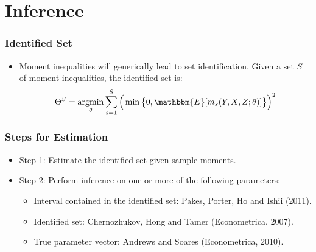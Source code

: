
\section{Inference}


\begin{frame}
\frametitle{Identified Set}

\begin{itemize}
\item Moment inequalities will generically lead to set identification. Given
a set $S$ of moment inequalities, the identified set is:  
\begin{equation*}
\Theta^{S}=\operatornamewithlimits{argmin}_{\theta}\sum_{s=1}^{S}\Big(\min%
\big\{0,\mathbbm{E}[m_{s}(Y,X,Z;\theta)]\big\}\Big)^{2}
\end{equation*}
\begin{figure}[h!]
\begin{center}
   
\end{center}
\end{figure}
\end{itemize}
\end{frame}


\begin{frame}
\frametitle{Steps for Estimation}

\begin{itemize}
\item Step 1: Estimate the identified set given sample moments. 

\item Step 2: Perform inference on one or more of the following parameters: 

\begin{itemize}
\item Interval contained in the identified set: Pakes, Porter, Ho and Ishii
(2011). 

\item Identified set: Chernozhukov, Hong and Tamer (Econometrica, 2007). 

\item True parameter vector: Andrews and Soares (Econometrica, 2010). 
\end{itemize}
\end{itemize}
\end{frame}


